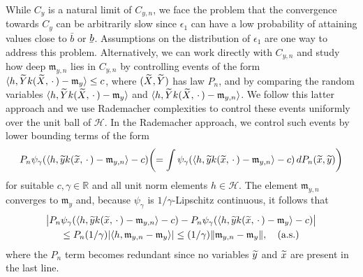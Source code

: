 \documentclass[AHL,Unicode,longabstracts,published]{cedram}
\theoremstyle{remark}
\newcommand{\R}{\mathbb{R}}
\newcommand{\cH}{\mathcal{H}}
\newcommand{\mean}{\mathfrak{m}}
\newcommand{\ubar}[1]{\underaccent{\bar}{#1}}
\let\oldtilde\tilde
\renewcommand*{\tilde}[1]{\mathchoice{\widetilde{#1}}{\widetilde{#1}}{\oldtilde{#1}}{\oldtilde{#1}}}
\let\originalleft\left
\let\originalright\right
\renewcommand{\left}{\mathopen{}\mathclose\bgroup\originalleft}
\renewcommand{\right}{\aftergroup\egroup\originalright}
\begin{document}
While $C_y$ is a natural limit of $C_{y,n}$, we face the problem that the convergence towards $C_y$ can be arbitrarily slow since $\epsilon_1$ can have a low probability of attaining values close to $\bar b$ or $\ubar{b}$. Assumptions on the distribution of $\epsilon_1$ are one way to address this problem. Alternatively, we can work directly with $C_{y,n}$ and study how deep $\mean_{y,n}$ lies in $C_{y,n}$ by controlling events of the form $ \langle h, \tilde Y k(\tilde X,\,\cdot\,) - \mean_y \rangle \leq c $, where $(\tilde X,\tilde Y)$ has law $P_n$, and by comparing the random variables $\langle h, \tilde Y k(\tilde X,\,\cdot\,) - \mean_y \rangle$ and $\langle h, \tilde Y k(\tilde X,\,\cdot\,) - \mean_{y,n} \rangle$. We follow this latter approach and we use Rademacher complexities to control these events uniformly over the unit ball of $\cH$. In the Rademacher approach, we control such events by lower bounding terms of the form
\begin{equation*}
P_n \psi_\gamma(\langle h, \tilde y k(\tilde x,\,\cdot\,) - \mean_{y,n} \rangle - c) \left(= \int \psi_\gamma(\langle h, \tilde y k(\tilde x,\,\cdot\,) - \mean_{y,n} \rangle - c) \,dP_n(\tilde x,\tilde y) \right)
\end{equation*}
for suitable $c,\gamma \in \R$ and all unit norm elements $h\in \cH$. The element $\mean_{y,n}$ converges to $\mean_y$ and, because $\psi_\gamma$ is $1/\gamma$-Lipschitz continuous, it follows that
\begin{multline}\label{eq:lip_to_mean}
\bigl|P_n \psi_\gamma(\langle h, \tilde y k(\tilde x,\,\cdot\,) - \mean_{y,n} \rangle - c) - P_n \psi_\gamma(\langle h, \tilde y k(\tilde x,\,\cdot\,) - \mean_{y} \rangle - c)\bigr|  \\
\leq P_n (1/\gamma) | \langle h, \mean_{y,n} - \mean_y \rangle| \leq (1/\gamma) \|\mean_{y,n} - \mean_y\|, \text{\quad (a.s.)} 
\end{multline}
where the $P_n$ term becomes redundant since no variables $\tilde y$ and $\tilde x$ are present in the last line.
\end{document}
